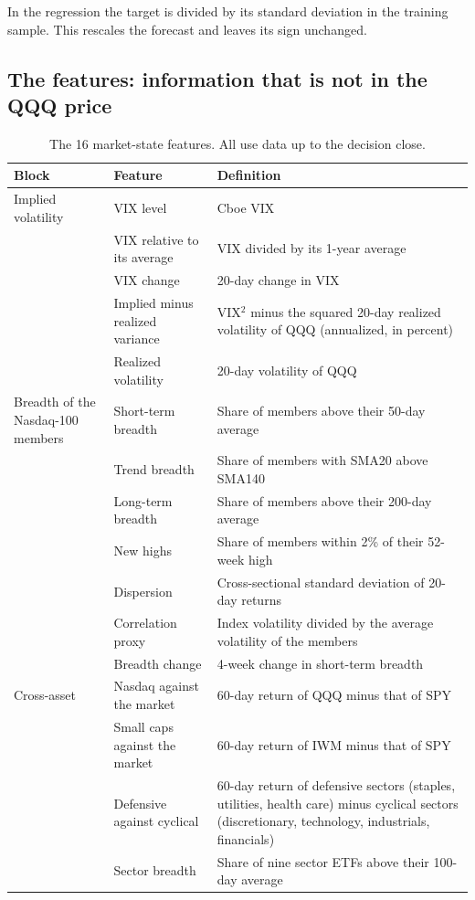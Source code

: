 \documentclass[11pt]{article}
\begin{document}
In the regression the target is divided by its standard deviation in the training sample. This rescales the forecast and leaves its sign unchanged.

\subsection{The features: information that is not in the QQQ price}

\begin{table}[H]
\centering\small
\caption{The 16 market-state features. All use data up to the decision close.}
\label{tab:features}
\begin{tabularx}{\textwidth}{@{}p{}p{}X@{}}
\toprule
Block & Feature & Definition \\
\midrule
Implied volatility & VIX level & Cboe VIX \\
 & VIX relative to its average & VIX divided by its 1-year average \\
 & VIX change & 20-day change in VIX \\
 & Implied minus realized variance & VIX$^2$ minus the squared 20-day realized volatility of QQQ (annualized, in percent) \\
 & Realized volatility & 20-day volatility of QQQ \\
\addlinespace
Breadth of the Nasdaq-100 members & Short-term breadth & Share of members above their 50-day average \\
 & Trend breadth & Share of members with SMA20 above SMA140 \\
 & Long-term breadth & Share of members above their 200-day average \\
 & New highs & Share of members within 2\% of their 52-week high \\
 & Dispersion & Cross-sectional standard deviation of 20-day returns \\
 & Correlation proxy & Index volatility divided by the average volatility of the members \\
 & Breadth change & 4-week change in short-term breadth \\
\addlinespace
Cross-asset & Nasdaq against the market & 60-day return of QQQ minus that of SPY \\
 & Small caps against the market & 60-day return of IWM minus that of SPY \\
 & Defensive against cyclical & 60-day return of defensive sectors (staples, utilities, health care) minus cyclical sectors (discretionary, technology, industrials, financials) \\
 & Sector breadth & Share of nine sector ETFs above their 100-day average \\
\bottomrule
\end{tabularx}
\end{table}
\end{document}
